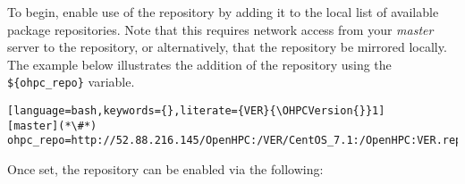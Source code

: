 To begin, enable use of the \OHPC{} repository by adding it to the local list of
available package repositories.  Note that this requires network access from
your {\em master} server to the \OHPC{} repository, or alternatively, that
the \OHPC{} repository be mirrored locally. The example below illustrates the addition
of the \OHPC{} repository using the \texttt{\$\{ohpc\_repo\}}
variable.

\begin{lstlisting}[language=bash,keywords={},literate={VER}{\OHPCVersion{}}1]
[master](*\#*) ohpc_repo=http://52.88.216.145/OpenHPC:/VER/CentOS_7.1:/OpenHPC:VER.repo
\end{lstlisting}

Once set, the repository can be enabled via the following: 






